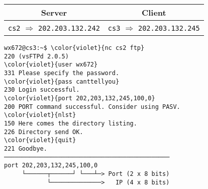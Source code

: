 \documentclass[varwidth=30em]{standalone}
\begin{document}
\begin{tabular}{cc}
  \toprule
  \textbf{Server}&\textbf{Client}\\\midrule
  \texttt{cs2} $\Rightarrow$ \texttt{202.203.132.242}& \texttt{cs3} $\Rightarrow$ \texttt{202.203.132.245}\\\bottomrule
\end{tabular}

\begin{Verbatim}[commandchars=\\\{\}]
wx672@cs3:~$ \color{violet}{nc cs2 ftp}
220 (vsFTPd 2.0.5)
\color{violet}{user wx672}
331 Please specify the password.
\color{violet}{pass canttellyou}
230 Login successful.
\color{violet}{port 202,203,132,245,100,0}
200 PORT command successful. Consider using PASV.
\color{violet}{nlst}
150 Here comes the directory listing.
226 Directory send OK.
\color{violet}{quit}
221 Goodbye.
──────────────────────────────────────────────
port 202,203,132,245,100,0
     └──────┬──────┘ └───┴─> Port (2 x 8 bits)
            └──────────────>   IP (4 x 8 bits)
\end{Verbatim}
\end{document}
